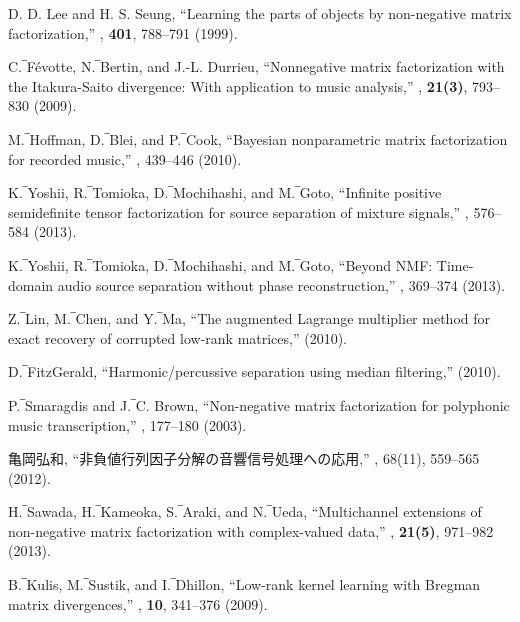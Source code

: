 \begin{thebibliography}{10}

D. D. Lee and H. S. Seung, 
\newblock ``Learning the parts of objects by non-negative matrix factorization,'' 
, {\bf 401}, 788--791 (1999).

C.‾{F\'{e}votte}, N.‾Bertin, and J.-L. Durrieu,
\newblock ``Nonnegative matrix factorization with the {I}takura-{S}aito
  divergence: {W}ith application to music analysis,''
, {\bf 21(3)}, 793--830 (2009).

M.‾Hoffman, D.‾Blei, and P.‾Cook,
\newblock ``{B}ayesian nonparametric matrix factorization for recorded music,''
, 439--446 (2010).

K.‾Yoshii, R.‾Tomioka, D.‾Mochihashi, and M.‾Goto,
\newblock ``Infinite positive semidefinite tensor factorization for source
  separation of mixture signals,''
, 576--584 (2013).

K.‾Yoshii, R.‾Tomioka, D.‾Mochihashi, and M.‾Goto,
\newblock ``Beyond NMF: Time-domain audio source separation without phase
  reconstruction,''
, 369--374 (2013).

Z.‾Lin, M.‾Chen, and Y.‾Ma,
\newblock ``The augmented {L}agrange multiplier method for exact recovery of
  corrupted low-rank matrices,''
 (2010).

D.‾FitzGerald,
\newblock ``Harmonic/percussive separation using median filtering,''
 (2010).

P.‾Smaragdis and J.‾C. Brown,
\newblock ``Non-negative matrix factorization for polyphonic music transcription,''
, 177--180 (2003).

亀岡弘和,
\newblock ``非負値行列因子分解の音響信号処理への応用,''
, 68(11), 559--565 (2012).

H.‾Sawada, H.‾Kameoka, S.‾Araki, and N.‾Ueda,
\newblock ``Multichannel extensions of non-negative matrix factorization with complex-valued data,''
, {\bf 21(5)}, 971--982 (2013).

B.‾Kulis, M.‾Sustik, and I.‾Dhillon,
\newblock ``Low-rank kernel learning with {B}regman matrix divergences,''
, {\bf 10}, 341--376 (2009).

\end{thebibliography}



